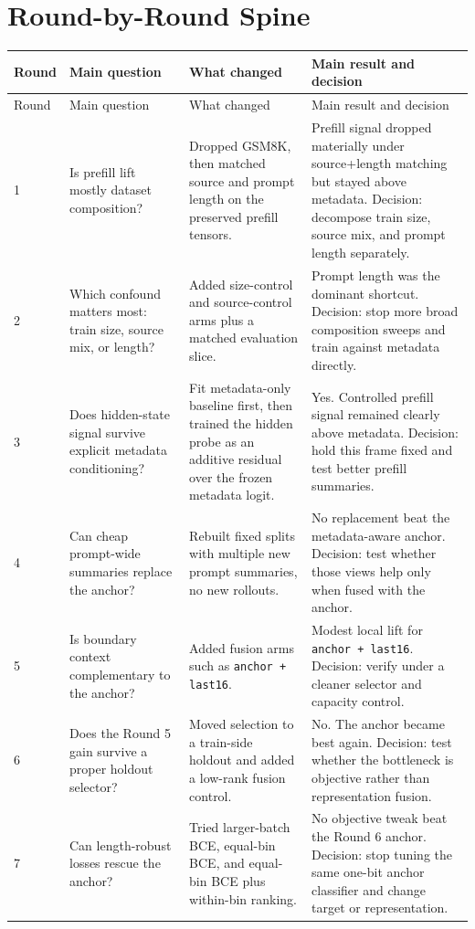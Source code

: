 \documentclass[11pt]{article}
\begin{document}
\section*{Round-by-Round Spine}
\small
\begin{longtable}{@{}p{0.8cm}p{3.0cm}p{4.3cm}p{6.0cm}@{}}
\toprule
Round & Main question & What changed & Main result and decision \\
\midrule
\endfirsthead
\toprule
Round & Main question & What changed & Main result and decision \\
\midrule
\endhead
1 & Is prefill lift mostly dataset composition? & Dropped GSM8K, then matched source and prompt length on the preserved prefill tensors. & Prefill signal dropped materially under source+length matching but stayed above metadata. Decision: decompose train size, source mix, and prompt length separately. \\
2 & Which confound matters most: train size, source mix, or length? & Added size-control and source-control arms plus a matched evaluation slice. & Prompt length was the dominant shortcut. Decision: stop more broad composition sweeps and train against metadata directly. \\
3 & Does hidden-state signal survive explicit metadata conditioning? & Fit metadata-only baseline first, then trained the hidden probe as an additive residual over the frozen metadata logit. & Yes. Controlled prefill signal remained clearly above metadata. Decision: hold this frame fixed and test better prefill summaries. \\
4 & Can cheap prompt-wide summaries replace the anchor? & Rebuilt fixed splits with multiple new prompt summaries, no new rollouts. & No replacement beat the metadata-aware anchor. Decision: test whether those views help only when fused with the anchor. \\
5 & Is boundary context complementary to the anchor? & Added fusion arms such as \texttt{anchor + last16}. & Modest local lift for \texttt{anchor + last16}. Decision: verify under a cleaner selector and capacity control. \\
6 & Does the Round 5 gain survive a proper holdout selector? & Moved selection to a train-side holdout and added a low-rank fusion control. & No. The anchor became best again. Decision: test whether the bottleneck is objective rather than representation fusion. \\
7 & Can length-robust losses rescue the anchor? & Tried larger-batch BCE, equal-bin BCE, and equal-bin BCE plus within-bin ranking. & No objective tweak beat the Round 6 anchor. Decision: stop tuning the same one-bit anchor classifier and change target or representation. \\

\end{longtable}
\end{document}
